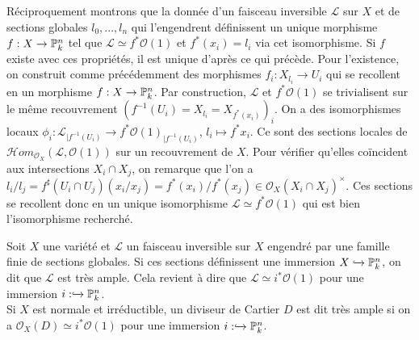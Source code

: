 Réciproquement montrons que la donnée d'un faisceau inversible $\mathcal{L}$ sur $X$ et de sections globales $l_0,...,l_n$ qui l'engendrent définissent un unique morphisme $f:X\rightarrow \mathbb{P}^n_k$ tel que $\mathcal{L}\simeq f^*\mathcal{O}(1)$ et $f^*(x_i)=l_i$ via cet isomorphisme. Si $f$ existe avec ces propriétés, il est unique d'après ce qui précède. Pour l'existence, on construit comme précédemment des morphismes $f_i:X_{l_i}\rightarrow U_i$ qui se recollent en un morphisme $f:X\rightarrow \mathbb{P}^n_k$. Par construction, $\mathcal{L}$ et $f^*\mathcal{O}(1)$ se trivialisent sur le même recouvrement $(f^{-1}(U_i)=X_{l_i}=X_{f^*(x_i)})_i$. On a des isomorphismes locaux $\phi_i:\mathcal{L}_{|f^{-1}(U_i)}\rightarrow f^*\mathcal{O}(1)_{|f^{-1}(U_i)}$, $l_i\mapsto f^*x_i$. Ce sont des sections locales de $\mathscr{H}om_{\mathcal{O}_X}(\mathcal{L},\mathcal{O}(1))$ sur un recouvrement de $X$. Pour vérifier qu'elles coïncident aux intersections $X_i\cap X_j$, on remarque que l'on a $l_i/l_j=f^\sharp(U_i\cap U_j)(x_i/x_j)= f^*(x_i)/f^*(x_j)\in \mathcal{O}_X(X_i\cap X_j)^\times$. Ces sections se recollent donc en un unique isomorphisme $\mathcal{L}\simeq f^*\mathcal{O}(1)$ qui est bien l'isomorphisme recherché.

\begin{defn}
Soit $X$ une variété et $\mathcal{L}$ un faisceau inversible sur $X$ engendré par une famille finie de sections globales. Si ces sections définissent une immersion $X\xhookrightarrow{}\mathbb{P}_k^n$, on dit que $\mathcal{L}$ est très ample. Cela revient à dire que $\mathcal{L}\simeq i^*\mathcal{O}(1)$  pour une immersion $i:\xhookrightarrow{}\mathbb{P}_k^n$.\\
Si $X$ est normale et irréductible, un diviseur de Cartier $D$ est dit très ample si on a $\mathcal{O}_X(D)\simeq i^*\mathcal{O}(1)$ pour une immersion $i:\xhookrightarrow{}\mathbb{P}_k^n$.
\end{defn}


